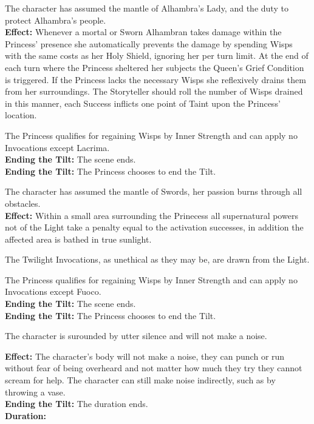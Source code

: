 \documentclass[10pt, frontgrid, backgrid]{flacards}
\begin{document}
{The character has assumed the mantle of Alhambra's Lady, and the duty to protect Alhambra's people.\\
\textbf{Effect:} Whenever a mortal or Sworn Alhambran takes damage within the Princess' presence she automatically prevents the damage by spending Wisps with the same costs as her Holy Shield, ignoring her per turn limit. At the end of each turn where the Princess sheltered her subjects the Queen's Grief Condition is triggered. If the Princess lacks the necessary Wisps she reflexively drains them from her surroundings. The Storyteller should roll the number of Wisps drained in this manner, each Success inflicts one point of Taint upon the Princess' location. 

The Princess qualifies for regaining Wisps by Inner Strength and can apply no Invocations except Lacrima.\\
\textbf{Ending the Tilt:} The scene ends.\\
\textbf{Ending the Tilt:} The Princess chooses to end the Tilt.}


{The character has assumed the mantle of Swords, her passion burns through all obstacles.\\
\textbf{Effect:} Within a small area surrounding the Prinecess all supernatural powers not of the Light take a penalty equal to the activation successes, in addition the affected area is bathed in true sunlight. 

The Twilight Invocations, as unethical as they may be, are drawn from the Light. 

The Princess qualifies for regaining Wisps by Inner Strength and can apply no Invocations except Fuoco.\\
\textbf{Ending the Tilt:} The scene ends.\\
\textbf{Ending the Tilt:} The Princess chooses to end the Tilt.}

{The character is surounded by utter silence and will not make a noise. 

\textbf{Effect:} The character's body will not make a noise, they can punch or run without fear of being overheard and not matter how much they try they cannot scream for help. The character can still make noise indirectly, such as by throwing a vase. \\
\textbf{Ending the Tilt:} The duration ends.\\
\textbf{Duration:} \fillunderline}
\end{document}

